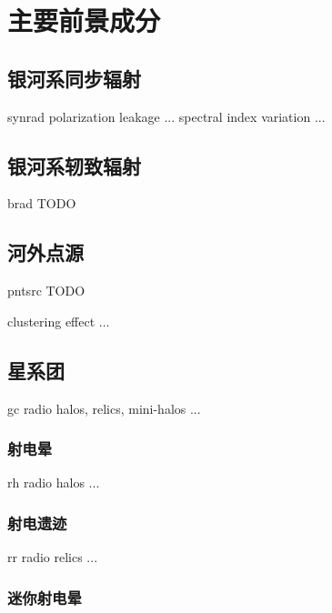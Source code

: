 \section{主要前景成分}
\label{sec:fg-intro}

\subsection{银河系同步辐射}

\acl{synrad}
polarization leakage ...
spectral index variation ...

\subsection{银河系轫致辐射}

\acl{brad}
TODO

\subsection{河外点源}

\acl{pntsrc}
TODO

clustering effect ...

\subsection{星系团}

\acl{gc}
radio halos, relics, mini-halos ...

\subsubsection{射电晕}

\acl{rh}
radio halos ...

\subsubsection{射电遗迹}

\acl{rr}
radio relics ...

\subsubsection{迷你射电晕}

